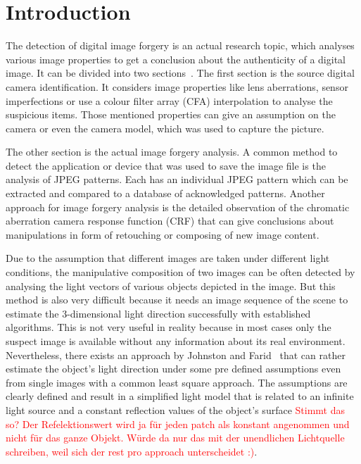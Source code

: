 \section{Introduction}\label{sec:Introduction}
The detection of digital image forgery is an actual research topic, which analyses various image properties to get a conclusion about the authenticity of a digital image. It can be divided into two sections~\cite{4284575}. The first section is the source digital camera identification. It considers image properties like lens aberrations, sensor imperfections or use a colour filter array (CFA) interpolation to analyse the suspicious items. Those mentioned properties can give an assumption on the camera or even the camera model, which was used to capture the picture.

The other section is the actual image forgery analysis. A common method to detect the application or device that was used to save the image file is the analysis of JPEG patterns. Each has an individual JPEG pattern which can be extracted and compared to a database of acknowledged patterns. Another approach for image forgery analysis is the detailed observation of the chromatic aberration camera response function (CRF) that can give conclusions about manipulations in form of retouching or composing of new image content. 

Due to the assumption that different images are taken under different light conditions, the manipulative composition of two images can be often detected by analysing the light vectors of various objects depicted in the image. But this method is also very difficult because it needs an image sequence of the scene to estimate the 3-dimensional light direction successfully with established algorithms. This is not very useful in reality because in most cases only the suspect image is available without any information about its real environment. Nevertheless, there exists an approach by Johnston and Farid~\cite{Johnson} that can rather estimate the object's light direction under some pre defined assumptions even from single images with a common least square approach. The assumptions are clearly defined and result in a simplified light model that is related to an infinite light source and a constant reflection values of the object's surface \textcolor{red}{Stimmt das so? Der Refelektionswert wird ja für jeden patch als konstant angenommen und nicht für das ganze Objekt. Würde da nur das mit der unendlichen Lichtquelle schreiben, weil sich der rest pro approach unterscheidet :)}.

